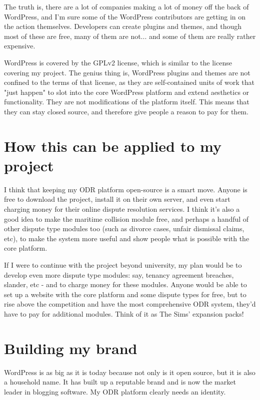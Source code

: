 The truth is, there are a lot of companies making a lot of money off the back of WordPress, and I'm sure some of the WordPress contributors are getting in on the action themselves. Developers can create plugins and themes, and though most of these are free, many of them are not... and some of them are really rather expensive.

WordPress is covered by the GPLv2 license, which is similar to the license covering my project. The genius thing is, WordPress plugins and themes are not confined to the terms of that license, as they are self-contained units of work that "just happen" to slot into the core WordPress platform and extend aesthetics or functionality. They are not modifications of the platform itself. This means that they can stay closed source, and therefore give people a reason to pay for them.

\section{How this can be applied to my project}

I think that keeping my ODR platform open-source is a smart move. Anyone is free to download the project, install it on their own server, and even start charging money for their online dispute resolution services. I think it's also a good idea to make the maritime collision module free, and perhaps a handful of other dispute type modules too (such as divorce cases, unfair dismissal claims, etc), to make the system more useful and show people what is possible with the core platform.

If I were to continue with the project beyond university, my plan would be to develop even more dispute type modules: say, tenancy agreement breaches, slander, etc - and to charge money for these modules. Anyone would be able to set up a website with the core platform and some dispute types for free, but to rise above the competition and have the most comprehensive ODR system, they'd have to pay for additional modules. Think of it as The Sims' expansion packs!

\section{Building my brand}

WordPress is as big as it is today because not only is it open source, but it is also a household name. It has built up a reputable brand and is now the market leader in blogging software. My ODR platform clearly needs an identity.

